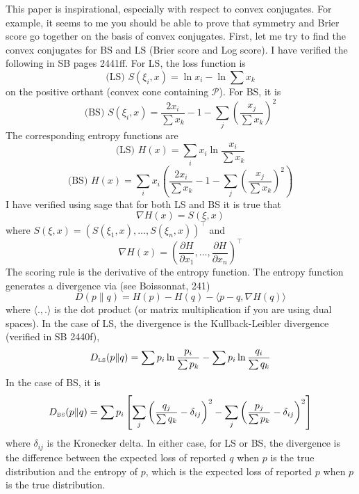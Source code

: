 \documentclass[12pt]{article}
\begin{document}
This paper is inspirational, especially with respect to convex
conjugates. For example, it seems to me you should be able to prove
that symmetry and Brier score go together on the basis of convex
conjugates. First, let me try to find the convex conjugates for BS and
LS (Brier score and Log score). I have verified the following in SB
pages 2441ff. For LS, the loss function is
\begin{equation}
  \label{eq:oneeraiw}
  \mbox{(LS) }S(\xi_{i},x)=\ln{}x_{i}-\ln\sum{}x_{k}
\end{equation}
on the positive orthant (convex cone containing $\mathcal{P}$). For
BS, it is
\begin{equation}
  \label{eq:hiexaeji}
  \mbox{(BS) }S(\xi_{i},x)=\frac{2x_{i}}{\sum{}x_{k}}-1-\sum_{j}\left(\frac{x_{j}}{\sum{}x_{k}}\right)^{2}
\end{equation}
The corresponding entropy functions are
\begin{equation}
  \label{eq:yeuthohn}
  \mbox{(LS) }H(x)=\sum_{i}{}x_{i}\ln\frac{x_{i}}{\sum{}x_{k}}
\end{equation}
\begin{equation}
  \label{eq:ahfooyai}
  \mbox{(BS) }H(x)=\sum_{i}{}x_{i}\left(\frac{2x_{i}}{\sum{}x_{k}}-1-\sum_{j}\left(\frac{x_{j}}{\sum{}x_{k}}\right)^2\right)
\end{equation}
I have verified using sage that for both LS and BS it is true that
\begin{equation}
  \label{eq:eikughoh}
  \nabla{}H(x)=S(\xi,x)
\end{equation}
where $S(\xi,x)=(S(\xi_{1},x),{\ldots},S(\xi_{n},x))^{\intercal}$ and
\begin{equation}
  \label{eq:esoobiey}
  \nabla{}H(x)=\left(\frac{\partial{}H}{\partial{}x_{1}},{\ldots},\frac{\partial{}H}{\partial{}x_{n}}\right)^{\intercal}
\end{equation}
The scoring rule is the derivative of the entropy function. The
entropy function generates a divergence via (see Boissonnat, 241)
\begin{equation}
  \label{eq:boodoquu}
  D(p\|q)=H(p)-H(q)-\langle{}p-q,\nabla{}H(q)\rangle
\end{equation}
where $\langle{}.,.\rangle$ is the dot product (or matrix
multiplication if you are using dual spaces). In the case of LS, the
divergence is the Kullback-Leibler divergence (verified in SB 2440f),
\begin{equation}
  \label{eq:engeequu}
  D_{\mbox{\tiny LS}}(p\|q)=\sum{}p_{i}\ln\frac{p_{i}}{\sum{}p_{k}}-\sum{}p_{i}\ln\frac{q_{i}}{\sum{}q_{k}}
\end{equation}
In the case of BS, it is
\begin{equation}
  \label{eq:aphooghi}
  D_{\mbox{\tiny BS}}(p\|q)=\sum{}p_{i}\left[\sum_{j}\left(\frac{q_{j}}{\sum{}q_{k}}-\delta_{ij}\right)^{2}-\sum_{j}\left(\frac{p_{j}}{\sum{}p_{k}}-\delta_{ij}\right)^{2}\right]
\end{equation}
where $\delta_{ij}$ is the Kronecker delta. In either case, for LS or
BS, the divergence is the difference between the expected loss of
reported $q$ when $p$ is the true distribution and the entropy of
$p$, which is the expected loss of reported $p$ when $p$ is the true
distribution.
\end{document}
